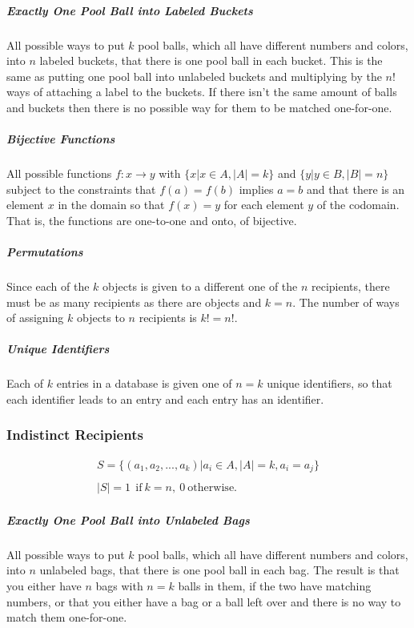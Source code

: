 \subparagraph{Exactly One Pool Ball into Labeled Buckets} All possible ways to put $k$ pool balls, which all have different numbers and colors, into $n$ labeled buckets, that there is one pool ball in each bucket. This is the same as putting one pool ball into unlabeled buckets and multiplying by the $n!$ ways of attaching a label to the buckets. If there isn't the same amount of balls and buckets then there is no possible way for them to be matched one-for-one.

\subparagraph{Bijective Functions} All possible functions $f:x \rightarrow y$ with $\{x | x\in A, |A| = k \}$ and $\{y | y\in B, |B| = n\}$ subject to the constraints that $f(a) = f(b)$ implies $a=b$ and that there is an element $x$ in the domain so that $f(x)=y$ for each element $y$ of the codomain. That is, the functions are one-to-one and onto, of bijective.

\subparagraph{Permutations} Since each of the $k$ objects is given to a different one of the $n$ recipients, there must be as many recipients as there are objects and $k=n$. The number of ways of assigning $k$ objects to $n$ recipients is $k!=n!$.

\subparagraph{Unique Identifiers} Each of $k$ entries in a database is given one of $n=k$ unique identifiers, so that each identifier leads to an entry and each entry has an identifier. 

\subsubsection{Indistinct Recipients}

\begin{equation}	
\begin{array}{l}
S = \{ (a_1,a_2,...,a_k) | a_i \in A, |A| = k, a_i=a_j\}\\
\\
|S| = 1\ \ \mathrm{if\ }k = n,\ 0\ \mathrm{otherwise.}
\end{array}
\end{equation}


\subparagraph{Exactly One Pool Ball into Unlabeled Bags} All possible ways to put $k$ pool balls, which all have different numbers and colors, into $n$ unlabeled bags, that there is one pool ball in each bag. The result is that you either have $n$ bags with $n=k$ balls in them, if the two have matching numbers, or that you either have a bag or a ball left over and there is no way to match them one-for-one.

